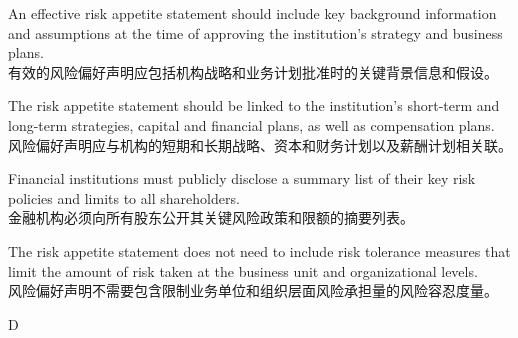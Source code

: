 \documentclass{article}
\begin{document}
        \begin{choices}
        \item An effective risk appetite statement should include key background information and assumptions at the time of approving the institution's strategy and business plans.\\
        有效的风险偏好声明应包括机构战略和业务计划批准时的关键背景信息和假设。
        
        \item The risk appetite statement should be linked to the institution's short-term and long-term strategies, capital and financial plans, as well as compensation plans.\\
        风险偏好声明应与机构的短期和长期战略、资本和财务计划以及薪酬计划相关联。
        
        \item Financial institutions must publicly disclose a summary list of their key risk policies and limits to all shareholders.\\
        金融机构必须向所有股东公开其关键风险政策和限额的摘要列表。
        
        \item The risk appetite statement does not need to include risk tolerance measures that limit the amount of risk taken at the business unit and organizational levels.\\
        风险偏好声明不需要包含限制业务单位和组织层面风险承担量的风险容忍度量。
        \end{choices}
        
        \begin{correctanswer}
        D
        \end{correctanswer}
        
\end{document}
